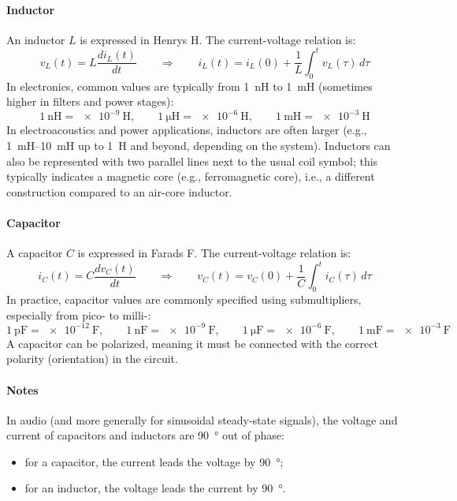 \paragraph{Inductor} An inductor \( L \) is expressed in Henrys \si{\henry}. The current-voltage relation is:
\[
v_L(t) = L\frac{d i_L(t)}{dt}
\qquad \Rightarrow \qquad
i_L(t) = i_L(0) + \frac{1}{L}\int_{0}^{t} v_L(\tau)\, d\tau
\]
In electronics, common values are typically from \SI{1}{\nano\henry} to \SI{1}{\milli\henry} (sometimes higher in filters and power stages):
\[
\SI{1}{\nano\henry}= \SI{e-9}{\henry},
\qquad
\SI{1}{\micro\henry}= \SI{e-6}{\henry},
\qquad
\SI{1}{\milli\henry}= \SI{e-3}{\henry}
\]
In electroacoustics and power applications, inductors are often larger (e.g., \SIrange{1}{10}{\milli\henry} up to \SI{1}{\henry} and beyond, depending on the system). Inductors can also be represented with two parallel lines next to the usual coil symbol; this typically indicates a magnetic core (e.g., ferromagnetic core), i.e., a different construction compared to an air-core inductor.

\paragraph{Capacitor} A capacitor \( C \) is expressed in Farads \si{\farad}. The current-voltage relation is:
\[
i_C(t) = C\frac{d v_C(t)}{dt}
\qquad \Rightarrow \qquad
v_C(t) = v_C(0) + \frac{1}{C}\int_{0}^{t} i_C(\tau)\, d\tau
\]
In practice, capacitor values are commonly specified using submultipliers, especially from pico- to milli-:
\[
\SI{1}{\pico\farad}= \SI{e-12}{\farad},
\qquad
\SI{1}{\nano\farad}= \SI{e-9}{\farad},
\qquad
\SI{1}{\micro\farad}= \SI{e-6}{\farad},
\qquad
\SI{1}{\milli\farad}= \SI{e-3}{\farad}
\]
A capacitor can be polarized, meaning it must be connected with the correct polarity (orientation) in the circuit.

\paragraph{Notes} In audio (and more generally for sinusoidal steady-state signals), the voltage and current of capacitors and inductors are \SI{90}{\degree} out of phase:
\begin{itemize}
    \item for a capacitor, the current leads the voltage by \SI{90}{\degree};
    \item for an inductor, the voltage leads the current by \SI{90}{\degree}.
\end{itemize}

